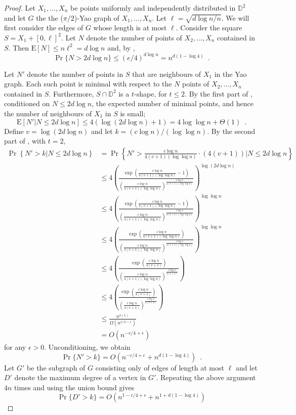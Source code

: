 \documentclass[lotsofwhite,charterfonts]{patmorin}
\newcommand{\D}{\mathbb{D}}
\newcommand{\PROB}{\Pr}
\newcommand{\EXP}{\mathrm{E}}
\begin{document}
\begin{proof}
Let $X_1,\ldots,X_n$ be points uniformly and independently distributed in
$\D^2$ and let $G$ the the ($\pi/2$)-Yao graph of $X_1,\ldots,X_n$.
Let $\ell=\sqrt{d\log n/n}$.  We will first consider the edges of $G$ whose
length is at most $\ell$.  Consider the square $S=X_1+[0,\ell]^2$.  Let
$N$ denote the number of points of $X_2,\ldots,X_n$ contained in $S$.  Then
$\EXP[N] \le n\ell^2 = d\log n$ and, by , 
\[
   \Pr\{N > 2d\log n\} \le (e/4)^{d\log n} = n^{d(1-\log 4)} \enspace .
\]

Let $N'$ denote the number of points in $S$ that are neighbours of $X_1$
in the Yao graph.  Each such point is minimal with respect to the $N$
points of $X_2,\ldots,X_n$ contained in $S$.  Furthermore, $S\cap\D^2$ is
a $t$-shape, for $t\le 2$.  By the first part of ,
conditioned on $N \le 2d\log n$, the expected number of minimal points, and
hence the number of neighbours of $X_1$
in $S$ is small;
\[
   \EXP[N'|N \le 2d\log n]
        \le 4(\log(2d\log n) + 1) 
          = 4\log\log n + \Theta(1)\enspace .
\]
Define $v=\log(2d\log n)$ and
let $k=(c\log n)/(\log\log n)$.  By the second part of
, with $t=2$,
\[
  \begin{aligned}
    \PROB\left\{N'> k|N\le 2d\log n\right\}  
    & = \PROB\left\{N'> \frac{c\log n}{4(v+1)(\log\log n)}\cdot(4(v+1)) |N\le 2d\log n\right\} \\
    & \le4\left
         (\frac{\exp\left(\frac{c\log n}{4(v+1)(\log\log n)}-1\right)}
          {\left(\frac{c\log n}{4(v+1)(\log\log n)}\right)^
           \frac{c\log n}{4(v+1)(\log\log n)}}
         \right)^{\log(2d\log n)} \\
    & \le4\left
         (\frac{\exp\left(\frac{c\log n}{4(v+1)(\log\log n)}-1\right)}
          {\left(\frac{c\log n}{4(v+1)(\log\log n)}\right)^
           \frac{c\log n}{4(v+1)(\log\log n)}}
         \right)^{\log\log n} \\
    & \le4\left
         (\frac{\exp\left(\frac{c\log n}{4(v+1)(\log\log n)}\right)}
          {\left(\frac{c\log n}{4(v+1)(\log\log n)}\right)^
           \frac{c\log n}{4(v+1)(\log\log n)}}
         \right)^{\log\log n} \\
    & \le
         4\left(\frac{\exp\left(\frac{c\log n}{4(v+1)}\right)}
          {\left(\frac{c\log n}{4(v+1)(\log\log n)}\right)^{\frac{c\log
n}{4(v+1)}}} \right) \\
    & \le
         4\left(\frac{\exp\left(\frac{c\log n}{4(v+1)}\right)}
          {\left(\frac{c\log n}{4(v+1)}\right)^{\frac{c\log n}{4(v+1)}}} \right) \\
    & \le \frac{n^{o(1)}}{\Omega(n^{c/4-\epsilon})} \\
    & =  O(n^{-c/4 + \epsilon}) 
 \end{aligned} 
\]
for any $\epsilon > 0$.  Unconditioning, we obtain
\[
   \PROB\{N' > k\} = O(n^{-c/4+\epsilon} + n^{d(1-\log 4)}) \enspace .
\]
Let $G'$ be the subgraph of $G$ consisting only of edges of length at most
$\ell$ and let $D'$ denote the maximum degree of a vertex in $G'$.
Repeating the above argument $4n$ times and using the union bound gives
\[
   \PROB\{D' > k\} = O(n^{1-c/4+\epsilon} + n^{1+d(1-\log 4)})
\]


\end{proof}
\end{document}
